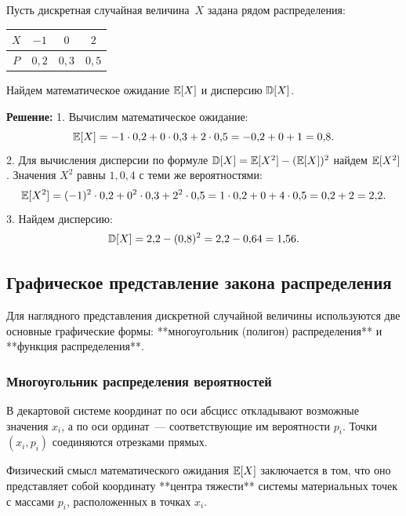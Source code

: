 \begin{example}
Пусть дискретная случайная величина~$X$ задана рядом распределения:
\begin{center}
\begin{tabular}{c|ccc}
\toprule
$X$ & $-1$ & $0$ & $2$ \\
\midrule
$P$ & $0{,}2$ & $0{,}3$ & $0{,}5$ \\
\bottomrule
\end{tabular}
\end{center}
Найдем математическое ожидание $\mathbb{E}[X]$ и дисперсию $\mathbb{D}[X]$.

\textbf{Решение:}
1. Вычислим математическое ожидание:
\[
\mathbb{E}[X] = -1 \cdot 0{,}2 + 0 \cdot 0{,}3 + 2 \cdot 0{,}5 = -0{,}2 + 0 + 1 = 0{,}8.
\]
2. Для вычисления дисперсии по формуле $\mathbb{D}[X] = \mathbb{E}[X^2] - (\mathbb{E}[X])^2$ найдем $\mathbb{E}[X^2]$. Значения $X^2$ равны $1, 0, 4$ с теми же вероятностями:
\[
\mathbb{E}[X^2] = (-1)^2 \cdot 0{,}2 + 0^2 \cdot 0{,}3 + 2^2 \cdot 0{,}5 = 1 \cdot 0{,}2 + 0 + 4 \cdot 0{,}5 = 0{,}2 + 2 = 2{,}2.
\]
3. Найдем дисперсию:
\[
\mathbb{D}[X] = 2{,}2 - (0{,}8)^2 = 2{,}2 - 0{,}64 = 1{,}56.
\]
\end{example}

\subsection{Графическое представление закона распределения}

Для наглядного представления дискретной случайной величины используются две основные графические формы: **многоугольник (полигон) распределения** и **функция распределения**.

\subsubsection{Многоугольник распределения вероятностей}
В декартовой системе координат по оси абсцисс откладывают возможные значения $x_i$, а по оси ординат~--- соответствующие им вероятности $p_i$. Точки $(x_i, p_i)$ соединяются отрезками прямых.

Физический смысл математического ожидания $\mathbb{E}[X]$ заключается в том, что оно представляет собой координату **центра тяжести** системы материальных точек с массами $p_i$, расположенных в точках $x_i$.

